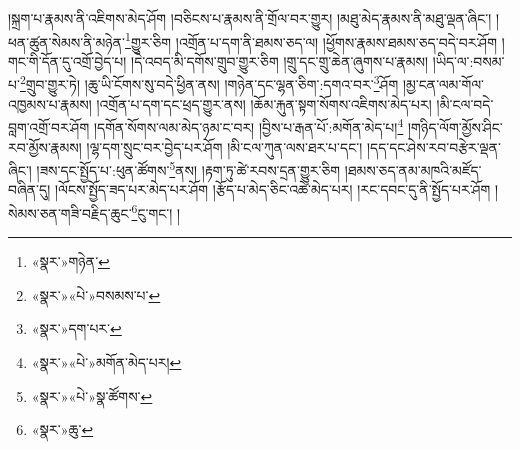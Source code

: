 །སྐྲག་པ་རྣམས་ནི་འཇིགས་མེད་ཤོག །བཅིངས་པ་རྣམས་ནི་གྲོལ་བར་གྱུར། །མཐུ་མེད་རྣམས་ནི་མཐུ་ལྡན་ཞིང་། །ཕན་ཚུན་སེམས་ནི་མཉེན་\footnote{«སྣར་»གཉེན་}གྱུར་ཅིག །འགྲོན་པ་དག་ནི་ཐམས་ཅད་ལ། །ཕྱོགས་རྣམས་ཐམས་ཅད་བདེ་བར་ཤོག །གང་གི་དོན་དུ་འགྲོ་བྱེད་པ། །དེ་འབད་མི་དགོས་གྲུབ་གྱུར་ཅིག །གྲུ་དང་གྲུ་ཆེན་ཞུགས་པ་རྣམས། །ཡིད་ལ་:བསམ་པ་\footnote{«སྣར་»«པེ་»བསམས་པ་}གྲུབ་གྱུར་ཏེ། །ཆུ་ཡི་ངོགས་སུ་བདེ་ཕྱིན་ནས། །གཉེན་དང་ལྷན་ཅིག་:དགའ་བར་\footnote{«སྣར་»དག་པར་}ཤོག །མྱ་ངན་ལམ་གོལ་འཁྱམས་པ་རྣམས། །འགྲོན་པ་དག་དང་ཕྲད་གྱུར་ནས། །ཆོམ་རྐུན་སྟག་སོགས་འཇིགས་མེད་པར། །མི་ངལ་བདེ་བླག་འགྲོ་བར་ཤོག །དགོན་སོགས་ལམ་མེད་ཉམ་ང་བར། །བྱིས་པ་རྒན་པོ་:མགོན་མེད་པ།\footnote{«སྣར་»«པེ་»མགོན་མེད་པར།} །གཉིད་ལོག་མྱོས་ཤིང་རབ་མྱོས་རྣམས། །ལྷ་དག་སྲུང་བར་བྱེད་པར་ཤོག །མི་ངལ་ཀུན་ལས་ཐར་པ་དང་། །དད་དང་ཤེས་རབ་བརྩེར་ལྡན་ཞིང་། །ཟས་དང་སྤྱོད་པ་:ཕུན་ཚོགས་\footnote{«སྣར་»«པེ་»སྣ་ཚོགས་}ནས། །རྟག་ཏུ་ཚེ་རབས་དྲན་གྱུར་ཅིག །ཐམས་ཅད་ནམ་མཁའི་མཛོད་བཞིན་དུ། །ལོངས་སྤྱོད་ཟད་པར་མེད་པར་ཤོག །རྩོད་པ་མེད་ཅིང་འཚེ་མེད་པར། །རང་དབང་དུ་ནི་སྤྱོད་པར་ཤོག །སེམས་ཅན་གཟི་བརྗིད་ཆུང་\footnote{«སྣར་»ཆུ་}ངུ་གང་། །
